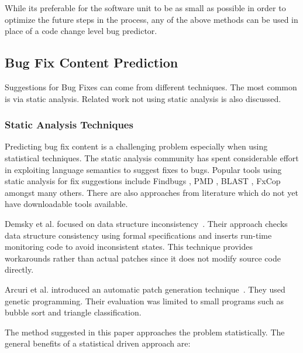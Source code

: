 \documentclass[journal,10pt,draftclsnofoot,twocolumn]{IEEEtran}
\begin{document}
\par While its preferable for the software unit to be as small as possible in order to optimize the future steps in the process, any of the above methods can be used in place of a code change level bug predictor.

\subsection{Bug Fix Content Prediction}

Suggestions for Bug Fixes can come from different techniques. The most common is via static analysis. Related work not using static analysis is also discussed. 

\subsubsection{Static Analysis Techniques}

Predicting bug fix content is a challenging problem especially when
using statistical techniques. The static analysis community has spent
considerable effort in exploiting language semantics to suggest fixes
to bugs. Popular tools using static analysis for fix suggestions
include Findbugs \cite{ayewah2008using}, PMD \cite{rutar2004comparison}, BLAST \cite{muhlberg2007blast}, FxCop \cite{wagner2008evaluation} amongst many others. There are also approaches from literature which do not yet have downloadable tools available. 

Demsky et al. focused on data structure
inconsistency~\cite{demsky_data_2005,demsky_inference_2006}. Their approach
checks data structure consistency using formal specifications and inserts
run-time monitoring code to avoid inconsistent states. This technique
provides workarounds rather than actual patches since it does not modify source
code directly.

Arcuri et al. introduced an automatic patch generation
technique~\cite{arcuri_automation_2008,arcuri_multi-objective_2008,arcuri_novel_2008}. They used genetic programming. Their evaluation was limited to
small programs such as bubble sort and triangle classification.

The method suggested in this paper
approaches the problem statistically. The general benefits of a statistical
driven approach are:
\end{document}
